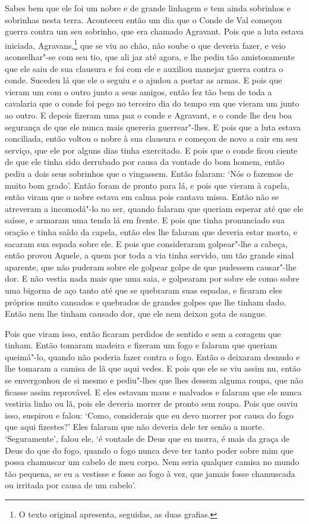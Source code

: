 Sabes bem que ele foi um nobre e de grande linhagem e tem ainda sobrinhos e
sobrinhas nesta terra. Aconteceu então um dia que o Conde de Val começou guerra
contra um seu sobrinho, que era chamado Agravant. Pois que a luta estava
iniciada, Agravans,\footnote{ O texto original apresenta, seguidas, as duas
grafias.}  que se viu ao chão, não soube o que deveria fazer, e
veio aconselhar"-se com seu tio, que ali jaz até agora, e lhe pediu tão
amistosamente que ele saiu de sua clausura e foi com ele e auxiliou manejar
guerra contra o conde. Sucedeu lá que ele o seguiu e o ajudou a portar as
armas. E pois que vieram um com o outro junto a seus amigos, então fez tão bem
de toda a cavalaria que o conde foi pego no terceiro dia do tempo em que vieram
um junto ao outro. E depois fizeram uma paz o conde e Agravant, e o conde lhe
deu boa segurança de que ele nunca mais quereria guerrear"-lhes. E pois que a
luta estava conciliada, então voltou o nobre à sua clausura e começou de novo a
cair em seu serviço, que ele por alguns dias tinha exercitado. E pois que o
conde ficou ciente de que ele tinha sido derrubado por causa da vontade do bom
homem, então pediu a dois seus sobrinhos que o vingassem. Então falaram: ‘Nós o
fazemos de muito bom grado’. Então foram de pronto para lá, e
pois que vieram à capela, então viram que o nobre estava em calma pois cantava
missa. Então não se atreveram a incomodá"-lo no ser, quando falaram que queriam
esperar até que ele saísse, e armaram uma tenda lá em frente. E pois que tinha
pronunciado sua oração e tinha saído da capela, então eles lhe falaram que
deveria estar morto, e sacaram sua espada sobre ele. E pois que consideraram
golpear"-lhe a cabeça, então provou Aquele, a quem por toda a via tinha servido,
um tão grande sinal aparente, que não puderam sobre ele golpear golpe de que
pudessem causar"-lhe dor. E não vestia nada mais que uma saia, e
golpearam por sobre ele como sobre uma bigorna de aço tanto até que se
quebraram suas espadas, e ficaram eles próprios muito cansados e quebrados de
grandes golpes que lhe tinham dado. Então nem lhe tinham causado dor, que ele
nem deixou gota de sangue.

Pois que viram isso, então ficaram perdidos de sentido e sem a coragem que
tinham. Então tomaram madeira e fizeram um fogo e falaram que queriam
queimá"-lo, quando não poderia fazer contra o fogo. Então o deixaram desnudo e
lhe tomaram a camisa de lã que aqui vedes. E pois que ele se viu assim nu,
então se envergonhou de si mesmo e pediu"-lhes que lhes dessem alguma roupa, que
não ficasse assim reprovável. E eles estavam maus e malvados e falaram que ele
nunca vestiria linho ou lã, pois ele deveria morrer de pronto sem roupa. Pois
que ouviu isso, suspirou e falou: ‘Como, considerais que eu devo morrer por
causa do fogo que aqui fizestes?’ Eles falaram que não deveria dele ter senão
a morte. ‘Seguramente’, falou ele, ‘é vontade de Deus que eu morra, é mais da
graça de Deus do que do fogo, quando o fogo nunca deve ter tanto poder sobre
mim que possa chamuscar um cabelo de meu corpo. Nem seria qualquer camisa no
mundo tão pequena, se eu a vestisse e fosse ao fogo à vez, que jamais fosse
chamuscada ou irritada por causa de um cabelo’. 

